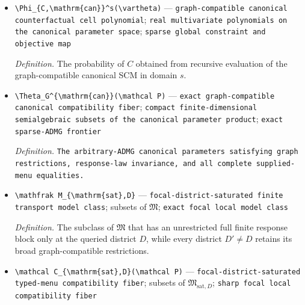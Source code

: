 \documentclass{article}
\begin{document}
\begin{itemize}
  \par\smallskip\noindent\emph{Definition.} \texttt{A tuple of graph-\allowbreak{}compatible one-\allowbreak{}hot structural tables and canonical exogenous probability vectors for the arbitrary-\allowbreak{}ADMG frontier.}
  \item \texttt{\textbackslash{}\allowbreak{}Phi\_\allowbreak{}\{C,\allowbreak{}\textbackslash{}\allowbreak{}mathrm\{can\}\allowbreak{}\}\allowbreak{}\textasciicircum{}s(\textbackslash{}\allowbreak{}vartheta)} --- \texttt{graph-\allowbreak{}compatible canonical counterfactual cell polynomial}; \texttt{real multivariate polynomials on the canonical parameter space}; \texttt{sparse global constraint and objective map}
  \par\smallskip\noindent\emph{Definition.} The probability of \(C\) obtained from recursive evaluation of the graph-compatible canonical SCM in domain \(s\).
  \item \texttt{\textbackslash{}\allowbreak{}Theta\_\allowbreak{}G\textasciicircum{}\{\textbackslash{}\allowbreak{}mathrm\{can\}\allowbreak{}\}\allowbreak{}(\textbackslash{}\allowbreak{}mathcal P)} --- \texttt{exact graph-\allowbreak{}compatible canonical compatibility fiber}; \texttt{compact finite-\allowbreak{}dimensional semialgebraic subsets of the canonical parameter product}; \texttt{exact sparse-\allowbreak{}ADMG frontier}
  \par\smallskip\noindent\emph{Definition.} \texttt{The arbitrary-\allowbreak{}ADMG canonical parameters satisfying graph restrictions,\allowbreak{} response-\allowbreak{}law invariance,\allowbreak{} and all complete supplied-\allowbreak{}menu equalities.}
  \item \texttt{\textbackslash{}\allowbreak{}mathfrak M\_\allowbreak{}\{\textbackslash{}\allowbreak{}mathrm\{sat\}\allowbreak{},\allowbreak{}D\}\allowbreak{}} --- \texttt{focal-\allowbreak{}district-\allowbreak{}saturated finite transport model class}; subsets of \(\mathfrak M\); \texttt{exact focal local model class}
  \par\smallskip\noindent\emph{Definition.} The subclass of \(\mathfrak M\) that has an unrestricted full finite response block only at the queried district \(D\), while every district \(D'\ne D\) retains its broad graph-compatible restrictions.
  \item \texttt{\textbackslash{}\allowbreak{}mathcal C\_\allowbreak{}\{\textbackslash{}\allowbreak{}mathrm\{sat\}\allowbreak{},\allowbreak{}D\}\allowbreak{}(\textbackslash{}\allowbreak{}mathcal P)} --- \texttt{focal-\allowbreak{}district-\allowbreak{}saturated typed-\allowbreak{}menu compatibility fiber}; subsets of \(\mathfrak M_{\mathrm{sat},D}\); \texttt{sharp focal local compatibility fiber}

\end{itemize}
\end{document}
